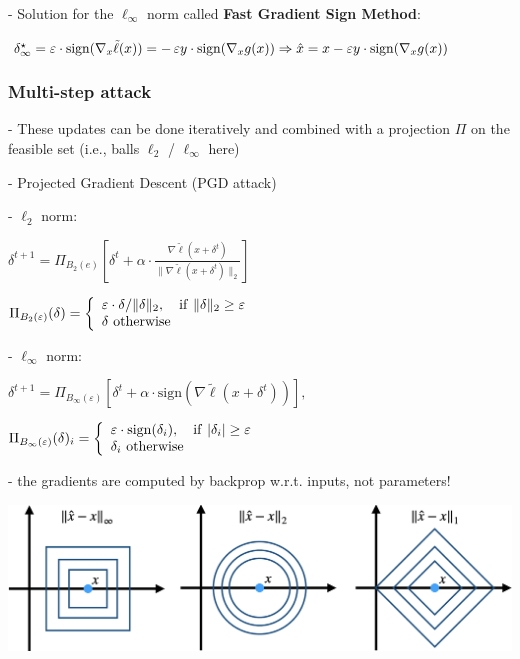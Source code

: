 - Solution for the $\ell_{\infty}$ norm called \textbf{Fast Gradient Sign Method}:

$\delta_{\infty}^{\star}=\varepsilon\cdot\mathrm{sign}(\nabla_{x}\tilde{\ell}(x))=-\,\varepsilon y\cdot\mathrm{sign}(\nabla_{x}g(x)) \Rightarrow \\ {\hat{x}}=x-\varepsilon y\cdot\operatorname{sign}(\nabla_{x}g(x))$

\subsubsection*{Multi-step attack}


- These updates can be done iteratively and combined with a projection $\Pi$ on the feasible set (i.e., balls $\ell_2$ / $\ell_\infty$ here)

- Projected Gradient Descent (PGD attack)

- $\ell_2$ norm:

$\delta^{t+1}=\Pi_{B_{2}(e)} [\delta^{t}+\alpha\cdot\frac{\nabla\tilde{\ell}(x+\delta^{t})}{\|\nabla\tilde{\ell}(x+\delta^{t})\|_{2}}]$

$\Pi_{B_{2}(\varepsilon)}(\delta)=\left\{\begin{array}{l l}{\varepsilon\cdot\delta/\|\delta\|_{2},\quad{\mathrm{if~}}\|\delta\|_{2}\geq\varepsilon}\\ {\delta \mathrm{~otherwise}}\end{array}\right.$

- $\ell_\infty$ norm:

$\delta^{t+1}=\Pi_{B_{\infty}(\varepsilon)}\left[\delta^{t}+\alpha\cdot\mathrm{sign}(\nabla\tilde{\ell}(x+\delta^{t}))\right],$

$\Pi_{B_{\infty}(\varepsilon)}(\delta)_i=\left\{\begin{array}{l l}{\varepsilon\cdot\mathrm{sign}(\delta_{i}),\ \ \ \mathrm{if}\ |\delta_{i}|\geq\varepsilon}\\ {\delta_i \mathrm{~otherwise}}\end{array}\right.$

- the gradients are computed by backprop w.r.t. inputs, not parameters!

\includegraphics[width=\columnwidth]{figures/lp_norms.png}

